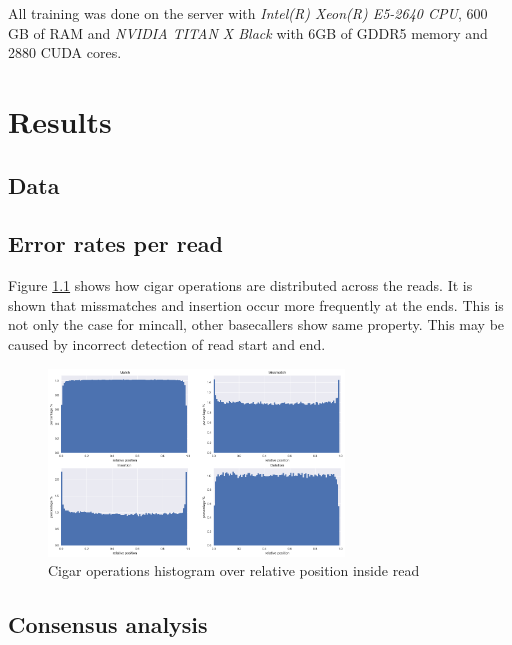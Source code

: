 \documentclass[times, utf8, diplomski, numeric, english]{fer}
\begin{document}
All training was done on the server with  \textit{Intel(R) Xeon(R) E5-2640 CPU}, 600 GB of RAM and \textit{NVIDIA TITAN X Black} with 6GB of GDDR5 memory and 2880 CUDA cores.


\chapter{Results}
\section{Data}

\section{Error rates per read}


Figure \ref{fg:cigar_op_dist} shows how cigar operations are distributed across the reads. It is shown that missmatches and insertion occur more frequently at the ends.  This is not only the case for mincall, other basecallers show same property. This may be caused by incorrect detection of read start and end.

\begin{figure}[!ht]
	\begin{center}
		\includegraphics[width=0.7\textwidth]{./imgs/operation_distributed_r9.png}
		\caption{Cigar operations histogram over relative position inside read}
		\label{fg:cigar_op_dist}
	\end{center}
\end{figure}

\section{Consensus analysis}

\end{document}
